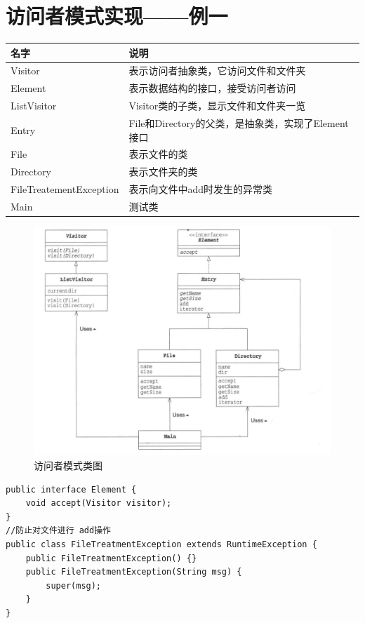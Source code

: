 \section{访问者模式实现——例一}
\begin{table}[!h]
	\begin{tabular}{|l|l|}
		\hline
		名字&说明\\
		\hline
		Visitor&表示访问者抽象类，它访问文件和文件夹\\
		\hline
		Element&表示数据结构的接口，接受访问者访问\\
		\hline
		ListVisitor&Visitor类的子类，显示文件和文件夹一览\\
		\hline
		Entry&File和Directory的父类，是抽象类，实现了Element接口\\
		\hline
		File&表示文件的类\\
		\hline
		Directory&表示文件夹的类\\
		\hline
		FileTreatementException&表示向文件中add时发生的异常类\\
		\hline
		Main&测试类\\
		\hline
	\end{tabular}
\end{table}
\begin{figure}[!h]
	\centering
	\includegraphics[width=\textwidth]{image/13-1}
	\caption{访问者模式类图}
\end{figure}
\begin{lstlisting}
public interface Element {
	void accept(Visitor visitor);
}
//防止对文件进行 add操作
public class FileTreatmentException extends RuntimeException {
	public FileTreatmentException() {}
	public FileTreatmentException(String msg) {
		super(msg);
	}
}
\end{lstlisting}
